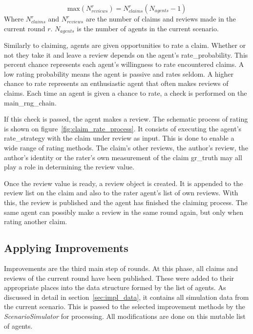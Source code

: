 \documentclass[%
    ]{\PathToTumTemplate/thesis/tum_thesis}
\begin{document}
\begin{equation}\label{eq:max_reviews}
	\mathrm{max}(N^r_{reviews}) = N^r_{claims} (N_{agents}-1)
\end{equation}
Where $ N^r_{claims} $ and $ N^r_{reviews} $ are the number of claims and reviews made in the current round $r$.
$ N_{agents} $ is the number of agents in the current scenario.

Similarly to claiming, agents are given opportunities to rate a claim.
Whether or not they take it and leave a review depends on the agent's \gls{rate_probability}.
This percent chance represents each agent's willingness to rate encountered claims.
A low rating probability means the agent is passive and rates seldom.
A higher chance to rate represents an enthusiastic agent that often makes reviews of claims.
Each time an agent is given a chance to rate, a check is performed on the \gls{main_rng_chain}.

If this check is passed, the agent makes a review.
The schematic process of rating is shown on figure~\ref{fig:claim_rate_process}.
It consists of executing the agent's \gls{rate_strategy} with the claim under review as input.
This is done to enable a wide range of rating methods.
The claim's other reviews, the author's review, the author's identity or the rater's own measurement of the claim \gls{gr_truth} may all play a role in determining the review value.

Once the review value is ready, a review object is created.
It is appended to the review list on the claim and also to the rater agent's list of own reviews.
With this, the review is published and the agent has finished the claiming process.
The same agent can possibly make a review in the same round again, but only when rating another claim.


\subsection{Applying Improvements}

Improvements are the third main step of rounds.
At this phase, all claims and reviews of the current round have been published.
These were added to their appropriate places into the data structure formed by the list of agents.
As discussed in detail in section~\ref{sec:impl_data}, it contains all simulation data from the current scenario.
This is passed to the selected improvement methods by the \emph{ScenarioSimulator} for processing.
All modifications are done on this mutable list of agents.
\end{document}
